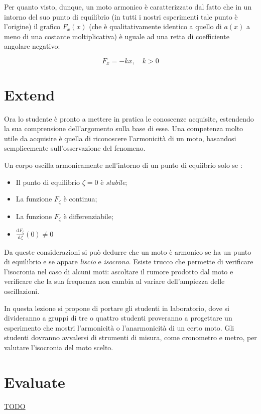 \documentclass{article}
\begin{document}
Per quanto visto, dunque, un moto armonico è caratterizzato dal fatto che in un intorno del suo punto di
equilibrio (in tutti i nostri esperimenti tale punto è l'origine) il grafico $F_x(x)$ (che è qualitativamente identico a
quello di $a(x)$ a meno di una costante moltiplicativa) è uguale ad una retta di coefficiente angolare negativo:

\begin{equation}
F_{x}=-kx, \quad k>0
\end{equation}

\section{Extend}
Ora lo studente è pronto a mettere in pratica le conoscenze
acquisite, estendendo la sua comprensione dell'argomento
sulla base di esse. Una competenza molto utile da acquisire
è quella di riconoscere l'armonicità di un moto, basandosi
semplicemente sull'osservazione del fenomeno.

Un corpo oscilla armonicamente nell'intorno di un punto
di equiibrio solo se \cite{giliberti2014detecting}:

\begin{itemize}
\item Il punto di equilibrio $\zeta=0$ è \emph{stabile};
\item La funzione $F_{\zeta}$ è continua;
\item La funzione $F_{\zeta}$ è differenziabile;
\item $\frac{\mathrm{d}F_{\zeta}}{\mathrm{d}\zeta}(0) \neq 0$
\end{itemize}

Da queste considerazioni si può dedurre che un moto
è armonico se ha un punto di equilibrio e se appare
\emph{liscio} e \emph{isocrono}.
Esiste trucco che permette di verificare l'isocronia
nel caso di alcuni moti: ascoltare il rumore prodotto
dal moto e verificare che la sua frequenza non cambia al
variare dell'ampiezza delle oscillazioni.

In questa lezione si propone di portare gli studenti
in laboratorio, dove si divideranno a gruppi di tre
o quattro studenti proveranno a progettare un esperimento
che mostri l'armonicità o l'anarmonicità di un certo moto.
Gli studenti dovranno avvalersi di strumenti di misura,
come cronometro e metro, per valutare l'isocronia del
moto scelto.

\section{Evaluate}
\underline{TODO}

{}

\end{document}
